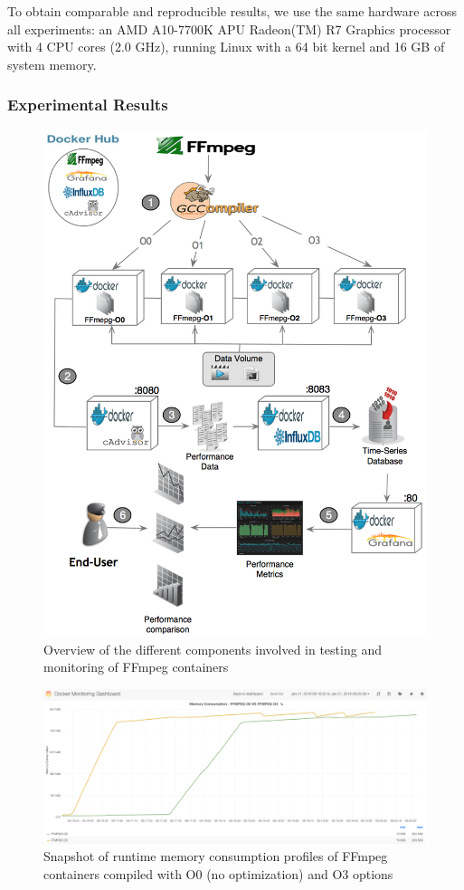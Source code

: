 To obtain comparable and reproducible results, we use the same hardware across all experiments: an AMD A10-7700K APU Radeon(TM) R7 Graphics processor with 4 CPU cores (2.0 GHz), running Linux with a 64 bit kernel and 16 GB of system memory.

\subsubsection{Experimental Results}
\begin{figure}[!t]
	\centering
	\includegraphics[width=1.\linewidth]{Ressources/infra_ffmpeg.png}
	\caption{Overview of the different components involved in testing and monitoring of FFmpeg containers}
\end{figure}


\begin{figure}[tbh]
	\includegraphics[width=1\linewidth]{Ressources/infra_stats.png}
	\caption{Snapshot of runtime memory consumption profiles of FFmpeg containers compiled with O0 (no optimization) and O3 options}
\end{figure}

